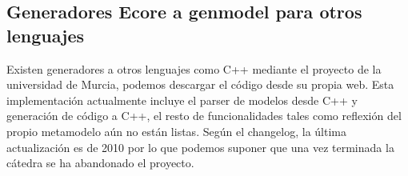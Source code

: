 \subsection{Generadores Ecore a genmodel para otros lenguajes}

Existen generadores a otros lenguajes como C++ mediante el proyecto \cite{emf4cpp_home} de la universidad de Murcia, podemos descargar el \cite{emf4cpp_code} código desde su propia web. Esta implementación actualmente incluye el parser de modelos desde C++ y generación de código a C++, el resto de funcionalidades tales como reflexión del propio \gls{metamodelo} aún no están listas.
Según el changelog, la última actualización es de 2010 por lo que podemos suponer que una vez terminada la cátedra se ha abandonado el proyecto.
